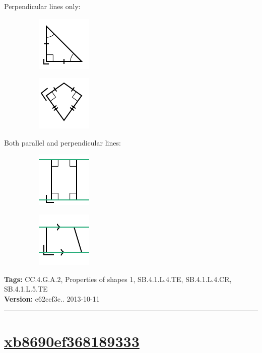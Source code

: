 \documentclass[twocolumn,10pt]{article}
\def\shrinkfactor{0.55}
\begin{document}
Perpendicular lines only:

$\phantom{xxxxxxxx}$
\includegraphics[scale=\shrinkfactor]{figures/f9413d967bb68c6b85d95672324c0a5b08af982e.png}

$\phantom{xxxxxxxx}$
\includegraphics[scale=\shrinkfactor]{figures/789e2f97ce566bdea069b01d730472c5c267c9de.png}

Both parallel and perpendicular lines:

$\phantom{xxxxxxxx}$
\includegraphics[scale=\shrinkfactor]{figures/ad42bf00e54b665d02d6e9aa787d9d04875ccc6e.png}

$\phantom{xxxxxxxx}$
\includegraphics[scale=\shrinkfactor]{figures/c755ceca3f49cc6303844bb5cd33f40647ddfab0.png}



\medskip
\noindent
\textbf{Tags:} {\footnotesize CC.4.G.A.2, Properties of shapes 1, SB.4.1.L.4.TE, SB.4.1.L.4.CR, SB.4.1.L.5.TE}\\
\textbf{Version:} e62ccf3c.. 2013-10-11
\smallskip\hrule





\section{\href{https://www.khanacademy.org/devadmin/content/items/xb8690ef368189333}{xb8690ef368189333}}
\end{document}

